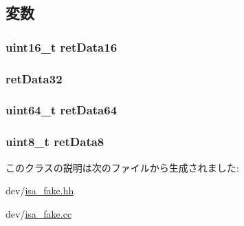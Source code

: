 \subsection{変数}
\hypertarget{classIsaFake_a6a50681a9e818e6de256e0b428d031d4}{
\subsubsection[{retData16}]{\setlength{\rightskip}{0pt plus 5cm}uint16\_\-t {\bf retData16}}}
\label{classIsaFake_a6a50681a9e818e6de256e0b428d031d4}
\hypertarget{classIsaFake_aff159069c738217f75e3bdf4048b7c20}{
\subsubsection[{retData32}]{ {\bf retData32}}}
\label{classIsaFake_aff159069c738217f75e3bdf4048b7c20}
\hypertarget{classIsaFake_a491508c3b16897f4ff96ef1ea2b2bebc}{
\subsubsection[{retData64}]{\setlength{\rightskip}{0pt plus 5cm}uint64\_\-t {\bf retData64}}}
\label{classIsaFake_a491508c3b16897f4ff96ef1ea2b2bebc}
\hypertarget{classIsaFake_ab214e69fe2d47c76466577f491122f50}{
\subsubsection[{retData8}]{\setlength{\rightskip}{0pt plus 5cm}uint8\_\-t {\bf retData8}}}
\label{classIsaFake_ab214e69fe2d47c76466577f491122f50}


このクラスの説明は次のファイルから生成されました:\begin{DoxyCompactItemize}
\item 
dev/\hyperlink{isa__fake_8hh}{isa\_\-fake.hh}\item 
dev/\hyperlink{isa__fake_8cc}{isa\_\-fake.cc}\end{DoxyCompactItemize}
